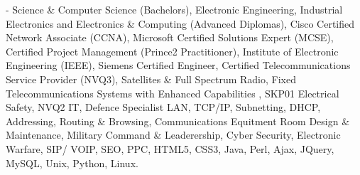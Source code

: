 \documentclass[letterpaper,10pt,english]{sphinxmanual}
\begin{document}
 - Science \& Computer Science (Bachelors), Electronic Engineering, Industrial Electronics and Electronics \& Computing (Advanced Diplomas), Cisco Certified Network Associate (CCNA), Microsoft Certified Solutions Expert (MCSE), Certified Project Management (Prince2 Practitioner), Institute of Electronic Engineering (IEEE), Siemens Certified Engineer, Certified Telecommunications Service Provider (NVQ3), Satellites \& Full Spectrum Radio, Fixed Telecommunications Systems with Enhanced Capabilities , SKP01 Electrical Safety, NVQ2 IT, Defence Specialist LAN, TCP/IP, Subnetting, DHCP, Addressing, Routing \& Browsing, Communications Equitment Room Design \& Maintenance, Military Command \& Leaderership,  Cyber Security, Electronic Warfare, SIP/ VOIP, SEO, PPC, HTML5, CSS3, Java, Perl, Ajax, JQuery, MySQL, Unix, Python, Linux.



\renewcommand{\indexname}{Index}
\printindex
\end{document}
